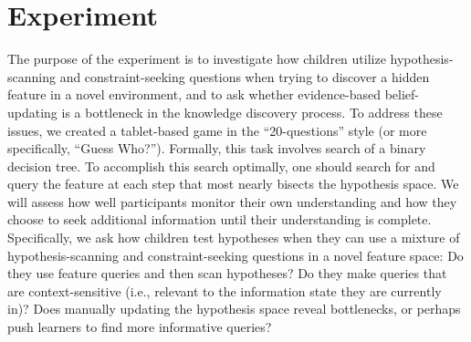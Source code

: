 \documentclass[man,floatsintext]{apa6}
\begin{document}
%
\section{Experiment}
The purpose of the experiment is to investigate how children utilize hypothesis-
scanning and constraint-seeking questions when trying to discover a hidden feature 
in a novel environment, and to ask whether evidence-based belief-updating is a 
bottleneck in the knowledge discovery process. To address these issues, we created 
a tablet-based game in the ``20-questions'' style (or more specifically, ``Guess 
Who?''). Formally, this task involves search of a binary decision tree. To accomplish 
this search optimally, one should search for and query the feature at each step that 
most nearly bisects the hypothesis space. 
We will assess how well 
participants monitor their own understanding and how they choose to seek additional 
information until their understanding is complete. Specifically, we ask how children 
test hypotheses when they can use a mixture of hypothesis-scanning and constraint-seeking 
questions in a novel feature space: Do they use feature queries and then scan hypotheses? 
Do they make queries that are context-sensitive (i.e., relevant to the information state 
they are currently in)? Does manually updating the hypothesis space reveal 
bottlenecks, or perhaps push learners to find more informative queries?
\end{document}
